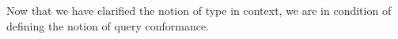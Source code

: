 


Now that we have clarified the notion of type in context, we are in condition of defining the notion of query conformance. 

